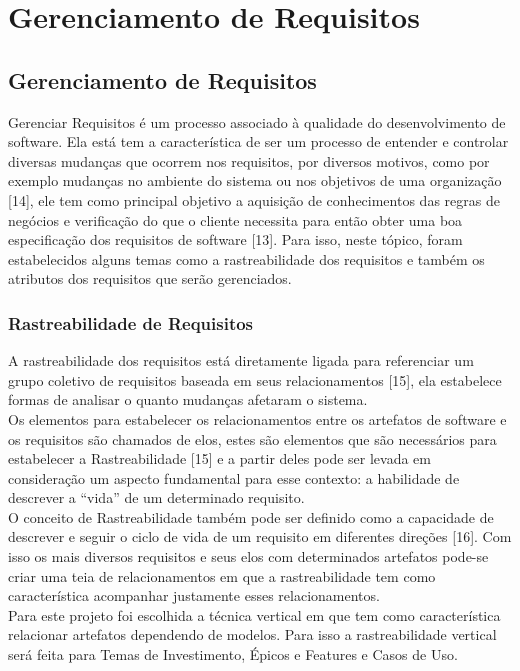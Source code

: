 \part{Gerenciamento de Requisitos}

\chapter[Gerenciamento de Requisitos]{Gerenciamento de Requisitos}


Gerenciar Requisitos é um processo associado à qualidade do desenvolvimento de software. Ela está tem a característica de ser um processo de entender e controlar diversas mudanças que ocorrem nos requisitos, por diversos motivos, como por exemplo mudanças no ambiente do sistema ou nos objetivos de uma organização [14], ele tem como principal objetivo a aquisição de conhecimentos das regras de negócios e verificação do que o cliente necessita para então obter uma boa especificação dos requisitos de software [13]. Para isso, neste tópico, foram estabelecidos alguns temas como a rastreabilidade dos requisitos e também os atributos dos requisitos que serão gerenciados.\\

\section{Rastreabilidade de Requisitos}
A rastreabilidade dos requisitos está diretamente ligada para referenciar um grupo coletivo de requisitos baseada em seus relacionamentos [15], ela estabelece formas de analisar o quanto mudanças afetaram o sistema.\\
\tab Os elementos para estabelecer os relacionamentos entre os artefatos de software e os requisitos são chamados de elos, estes são elementos que são necessários para estabelecer a Rastreabilidade [15] e a partir deles pode ser levada em consideração um aspecto fundamental para esse contexto: a habilidade de descrever a “vida” de um determinado requisito.\\
\tab O conceito de Rastreabilidade também pode ser definido como a capacidade de descrever e seguir o ciclo de vida de um requisito em diferentes direções [16]. Com isso os mais diversos requisitos e seus elos com determinados artefatos pode-se criar uma teia de relacionamentos em que a rastreabilidade tem como característica acompanhar justamente esses relacionamentos.\\
\tab Para este projeto foi escolhida a técnica vertical em que tem como característica relacionar artefatos dependendo de modelos. Para isso a rastreabilidade vertical será feita para Temas de Investimento, Épicos e Features e Casos de Uso.\\

